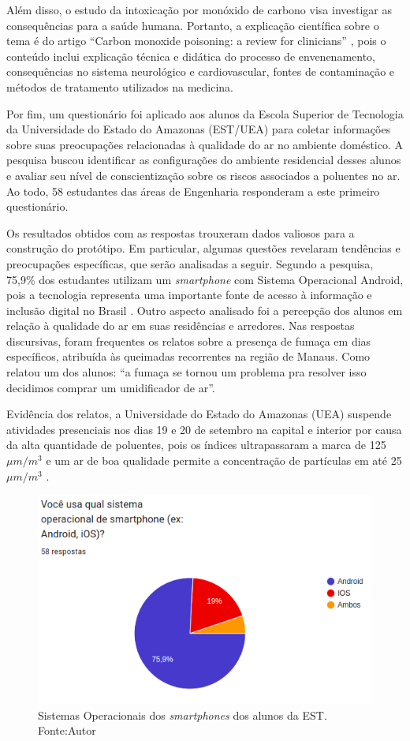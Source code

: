 Além disso, o estudo da intoxicação por monóxido de carbono visa investigar as consequências para a saúde humana. Portanto, a explicação científica sobre o tema é do 
artigo ``Carbon monoxide poisoning: a review for clinicians'' \cite{carbon-monoxide-poisoning-varon}, pois o conteúdo inclui 
explicação técnica e didática do processo de envenenamento, consequências no sistema neurológico e cardiovascular, fontes de contaminação e métodos de tratamento utilizados na medicina.

Por fim, um questionário foi aplicado aos alunos da Escola Superior de Tecnologia da Universidade do Estado do Amazonas (EST/UEA) para coletar informações sobre suas preocupações relacionadas à qualidade do ar no ambiente doméstico.
A pesquisa buscou identificar as configurações do ambiente residencial desses alunos e avaliar seu nível de conscientização sobre os riscos associados a poluentes no ar. Ao todo, 
58 estudantes das áreas de Engenharia responderam a este primeiro questionário.

Os resultados obtidos com as respostas trouxeram dados valiosos para a construção do protótipo. Em particular, algumas questões revelaram tendências e 
preocupações específicas, que serão analisadas a seguir. Segundo a pesquisa, 75,9\% dos estudantes utilizam um \textit{smartphone} com 
Sistema Operacional Android, pois a tecnologia representa uma importante fonte de acesso à informação e inclusão digital no Brasil \cite{impacto-android-brasil}. Outro aspecto analisado foi 
a percepção dos alunos em relação à qualidade do ar em suas residências e arredores. Nas respostas discursivas, foram frequentes os relatos sobre a presença de fumaça em dias específicos, 
atribuída às queimadas recorrentes na região de Manaus. Como relatou um dos alunos: ``a fumaça se tornou um problema pra resolver isso decidimos comprar um umidificador de ar''. 

Evidência dos relatos, a Universidade do Estado do Amazonas (UEA) suspende atividades presenciais nos dias 19 e 20 de setembro na capital e interior por causa 
da alta quantidade de poluentes, pois os índices ultrapassaram a marca de 125 $\mu m/m^{3}$ e um ar de boa qualidade permite a concentração de partículas em  até 25 $\mu m/m^{3}$ \cite{uea-queima-fecha}. 

\begin{figure}[ht]
    \centering
    \includegraphics[width=.67\textwidth]{img/graf1-SO-smartphone.png}
    \caption{Sistemas Operacionais dos \textit{smartphones} dos alunos da EST. Fonte:Autor}\label{figSOsmartphone}
\end{figure}

